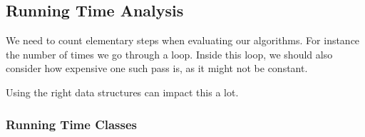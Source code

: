 \documentclass[12pt]{article}
\begin{document}



  \subsection{Running Time Analysis}


  We need to count elementary steps when evaluating our algorithms. For instance
  the number of times we go through a loop. Inside this loop, we should also
  consider how expensive one such pass is, as it might not be constant.

  Using the right data structures can impact this a lot.

  \subsubsection{Running Time Classes}
\end{document}

